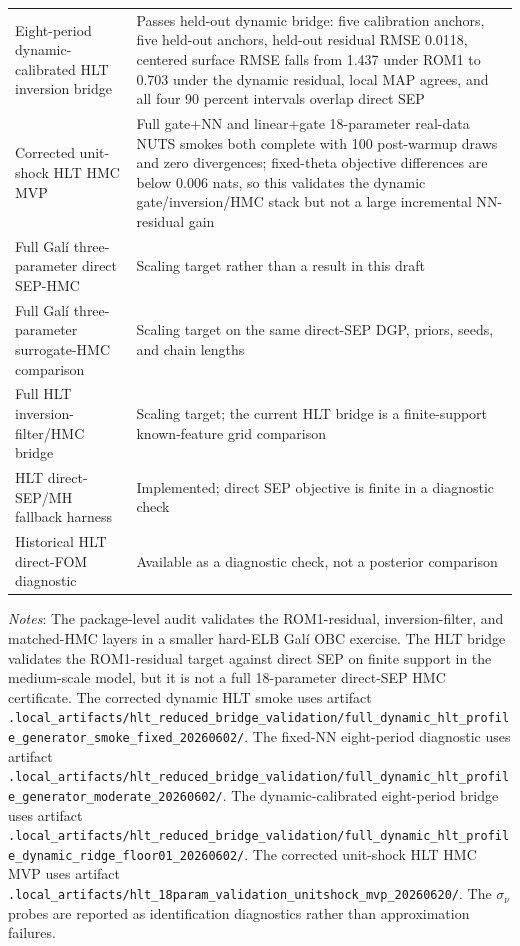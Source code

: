 \documentclass[12pt]{article}
\theoremstyle{plain}
\theoremstyle{definition}
\theoremstyle{remark}
\newcommand{\tablenotes}[1]{%
  \par\vspace{0.5em}%
  \noindent\begin{minipage}{\textwidth}%
  \raggedright\footnotesize #1%
  \end{minipage}\par%
}
\begin{document}
\begin{table}[htbp]
\begin{tabular}{>{\raggedright\arraybackslash}p{}>{\raggedright\arraybackslash}p{}}
Eight-period dynamic-calibrated HLT inversion bridge & Passes held-out dynamic bridge: five calibration anchors, five held-out anchors, held-out residual RMSE 0.0118, centered surface RMSE falls from 1.437 under ROM1 to 0.703 under the dynamic residual, local MAP agrees, and all four 90 percent intervals overlap direct SEP \\
Corrected unit-shock HLT HMC MVP & Full gate+NN and linear+gate 18-parameter real-data NUTS smokes both complete with 100 post-warmup draws and zero divergences; fixed-theta objective differences are below 0.006 nats, so this validates the dynamic gate/inversion/HMC stack but not a large incremental NN-residual gain \\
Full Gal\'i three-parameter direct SEP-HMC & Scaling target rather than a result in this draft \\
Full Gal\'i three-parameter surrogate-HMC comparison & Scaling target on the same direct-SEP DGP, priors, seeds, and chain lengths \\
Full HLT inversion-filter/HMC bridge & Scaling target; the current HLT bridge is a finite-support known-feature grid comparison \\
HLT direct-SEP/MH fallback harness & Implemented; direct SEP objective is finite in a diagnostic check \\
Historical HLT direct-FOM diagnostic & Available as a diagnostic check, not a posterior comparison \\
\bottomrule
\end{tabular}
\smallskip
\tablenotes{\textit{Notes}: The package-level audit validates the ROM1-residual, inversion-filter, and matched-HMC layers in a smaller hard-ELB Gal\'i OBC exercise. The HLT bridge validates the ROM1-residual target against direct SEP on finite support in the medium-scale model, but it is not a full 18-parameter direct-SEP HMC certificate. The corrected dynamic HLT smoke uses artifact \texttt{.local\_artifacts/hlt\_reduced\_bridge\_validation/full\_dynamic\_hlt\_profile\_generator\_smoke\_fixed\_20260602/}. The fixed-NN eight-period diagnostic uses artifact \texttt{.local\_artifacts/hlt\_reduced\_bridge\_validation/full\_dynamic\_hlt\_profile\_generator\_moderate\_20260602/}. The dynamic-calibrated eight-period bridge uses artifact \texttt{.local\_artifacts/hlt\_reduced\_bridge\_validation/full\_dynamic\_hlt\_profile\_dynamic\_ridge\_floor01\_20260602/}. The corrected unit-shock HLT HMC MVP uses artifact \texttt{.local\_artifacts/hlt\_18param\_validation\_unitshock\_mvp\_20260620/}. The $\sigma_\nu$ probes are reported as identification diagnostics rather than approximation failures.}
\end{table}
\end{document}
